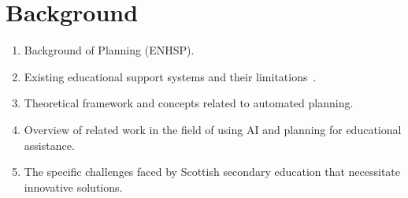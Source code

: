 \section{Background}
\begin{enumerate}
    \item Background of Planning (ENHSP).
    \item Existing educational support systems and their limitations~\cite{Castillo2009}.
    \item Theoretical framework and concepts related to automated planning.
    \item Overview of related work in the field of using AI and planning for educational assistance.
    \item The specific challenges faced by Scottish secondary education that necessitate innovative solutions.
\end{enumerate}
